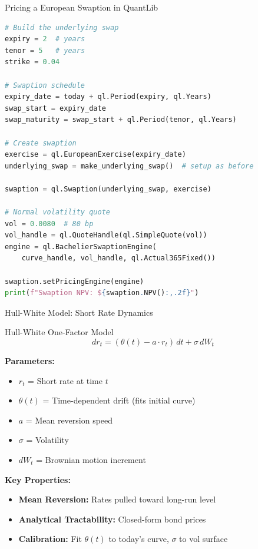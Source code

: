 \documentclass[aspectratio=169,11pt]{beamer}
\begin{document}
\begin{frame}[fragile]{Pricing a European Swaption in QuantLib}
\begin{lstlisting}[language=Python]
# Build the underlying swap
expiry = 2  # years
tenor = 5   # years
strike = 0.04

# Swaption schedule
expiry_date = today + ql.Period(expiry, ql.Years)
swap_start = expiry_date
swap_maturity = swap_start + ql.Period(tenor, ql.Years)

# Create swaption
exercise = ql.EuropeanExercise(expiry_date)
underlying_swap = make_underlying_swap()  # setup as before

swaption = ql.Swaption(underlying_swap, exercise)

# Normal volatility quote
vol = 0.0080  # 80 bp
vol_handle = ql.QuoteHandle(ql.SimpleQuote(vol))
engine = ql.BachelierSwaptionEngine(
    curve_handle, vol_handle, ql.Actual365Fixed())

swaption.setPricingEngine(engine)
print(f"Swaption NPV: ${swaption.NPV():,.2f}")
\end{lstlisting}
\end{frame}

\begin{frame}{Hull-White Model: Short Rate Dynamics}
\begin{block}{Hull-White One-Factor Model}
\[
dr_t = (\theta(t) - a \cdot r_t)\, dt + \sigma\, dW_t
\]
\end{block}

\textbf{Parameters:}
\begin{itemize}
    \item $r_t$ = Short rate at time $t$
    \item $\theta(t)$ = Time-dependent drift (fits initial curve)
    \item $a$ = Mean reversion speed
    \item $\sigma$ = Volatility
    \item $dW_t$ = Brownian motion increment
\end{itemize}

\textbf{Key Properties:}
\begin{itemize}
    \item \textbf{Mean Reversion:} Rates pulled toward long-run level
    \item \textbf{Analytical Tractability:} Closed-form bond prices
    \item \textbf{Calibration:} Fit $\theta(t)$ to today's curve, $\sigma$ to vol surface
\end{itemize}
\end{frame}
\end{document}
